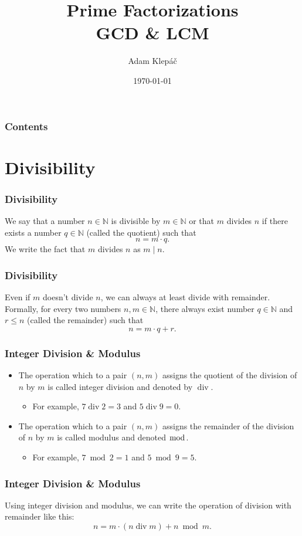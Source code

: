 \documentclass[aspectratio=169,11pt,usenames,dvipsnames]{beamer}
\title{Prime Factorizations\\
GCD \& LCM}
\date{\today}
\author{Adam Klepáč}
\institute[GEVO]{Gymnázium Evolution Jižní Město}
\newcommand{\N}{\mathbb{N}}
\DeclareMathOperator{\dv}{div}
\begin{document}
\titleframe

\begin{frame}
 \frametitle{Contents}
 \tableofcontents
\end{frame}

\section{Divisibility}

\begin{frame}
 \frametitle{Divisibility}
  We say that a number $n \in \N$ \alert{is divisible} by $m \in \N$ or that $m$
  \alert{divides} $n$ \pause
  if there exists a number $q \in \N$ (called the \alert{quotient}) such that
  \[
   n = m \cdot q.
  \]
  \pause
  We write the fact that $m$ divides $n$ as $m \mid n$.
\end{frame}

\begin{frame}
 \frametitle{Divisibility}
 Even if $m$ doesn't divide $n$, we can always at least \alert{divide with
 remainder}.\\
 \pause
 Formally, for every two numbers $n,m \in \N$, there always exist number $q \in
 \N$ and $r \leq n$ (called the \alert{remainder}) such that
 \[
  n = m \cdot q + r.
 \]
\end{frame}

\begin{frame}
 \frametitle{Integer Division \& Modulus}
 \begin{itemize}
  \item The operation which to a pair $(n,m)$ assigns the \alert{quotient} of
   the division of $n$ by $m$ is called \alert{integer division} and denoted by
   $\dv$.
  \pause
  \begin{itemize}
   \item For example, $7 \dv 2 = 3$ and $5 \dv 9 = 0$.
  \end{itemize}
  \pause
 \item The operation which to a pair $(n,m)$ assigns the \alert{remainder} of
  the division of $n$ by $m$ is called \alert{modulus} and denoted $\bmod$.
  \pause
  \begin{itemize}
   \item For example, $7 \bmod 2 = 1$ and $5 \bmod 9 = 5$.
  \end{itemize}
 \end{itemize}
\end{frame}

\begin{frame}
 \frametitle{Integer Division \& Modulus}
 Using integer division and modulus, we can write the operation of division with
 remainder like this:
 \[
  n = m \cdot (n \dv m) + n \bmod m.
 \]
\end{frame}
\end{document}
